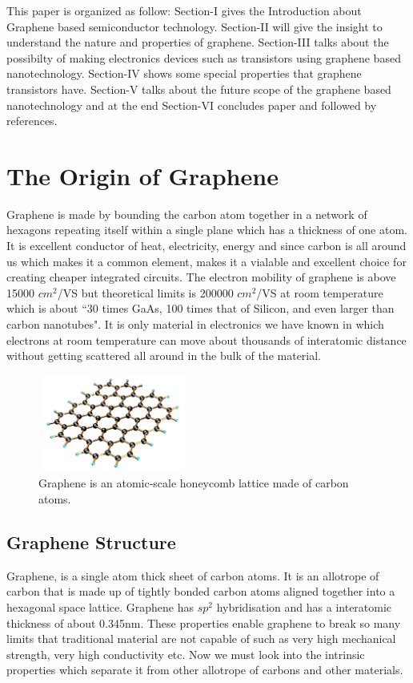 \documentclass[conference]{IEEEtran}
\begin{document}
This paper is organized as follow: Section-I gives the Introduction about Graphene based semiconductor technology. Section-II will give the insight to understand the nature and properties of graphene. Section-III talks about the possibilty of making electronics devices such as transistors using graphene based nanotechnology. Section-IV shows some special properties that graphene transistors have. Section-V talks about the future scope of the graphene based nanotechnology and at the end Section-VI concludes paper and followed by references.

\section{\textbf{The Origin of Graphene}}
Graphene is made by bounding the carbon atom together in a network of hexagons repeating itself within a single plane which has a thickness of one atom. It is excellent conductor of heat, electricity, energy and since carbon is all around us which makes it a common element, makes it a vialable and excellent choice for creating cheaper integrated circuits. The electron mobility of graphene is above 15000 $cm^2$/VS but theoretical limits is 200000 $cm^2$/VS at room temperature which is about “30 times GaAs, 100 times that of Silicon, and even larger than carbon nanotubes". It is only material in electronics we have known in which electrons at room temperature can move about thousands of interatomic distance without getting scattered all around in the bulk of the material.

\begin{figure}[h]
\centering
\includegraphics[width=5cm, height=3.2cm]{graphene.jpg}
\caption{Graphene is an atomic-scale honeycomb lattice made of carbon atoms.}
\end{figure}

\subsection{\textbf{Graphene Structure}}
Graphene, is a single atom thick sheet of carbon atoms. It is an allotrope of carbon that is made up of tightly bonded carbon atoms aligned together into a hexagonal space lattice. Graphene has $sp^2$ hybridisation and has a interatomic thickness of about 0.345nm. These properties enable graphene to break so many limits that traditional material are not capable of such as very high mechanical strength, very high conductivity etc. Now we must look into the intrinsic properties which separate it from other allotrope of carbons and other materials.
\end{document}
